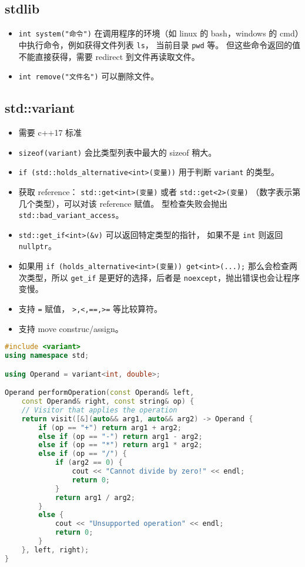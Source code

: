 \subsection{stdlib}
\begin{itemize}
\item \verb`int system("命令")` 在调用程序的环境（如 linux 的 bash，windows 的 cmd）中执行命令，例如获得文件列表 \verb`ls`， 当前目录 \verb`pwd` 等。 但这些命令返回的值不能直接获得，需要 redirect 到文件再读取文件。
\item \verb`int remove("文件名")` 可以删除文件。
\end{itemize}

\subsection{std::variant}
\begin{itemize}
\item 需要 c++17 标准
\item \verb`sizeof(variant)` 会比类型列表中最大的 sizeof 稍大。
\item \verb`if (std::holds_alternative<int>(变量))` 用于判断 \verb`variant` 的类型。
\item 获取 reference： \verb`std::get<int>(变量)` 或者 \verb`std::get<2>(变量)` （数字表示第几个类型），可以对该 reference 赋值。 型检查失败会抛出 \verb`std::bad_variant_access`。
\item \verb`std::get_if<int>(&v)` 可以返回特定类型的指针， 如果不是 \verb`int` 则返回 \verb`nullptr`。
\item 如果用 \verb`if (holds_alternative<int>(变量)) get<int>(...);` 那么会检查两次类型，所以 \verb`get_if` 是更好的选择，后者是 \verb`noexcept`，抛出错误也会让程序变慢。
\item 支持 \verb`=` 赋值， \verb`>,<,==,>=` 等比较算符。
\item 支持 move construc/assign。
\end{itemize}
\begin{lstlisting}[language=cpp]
#include <variant>
using namespace std;

using Operand = variant<int, double>;

Operand performOperation(const Operand& left,
    const Operand& right, const string& op) {
    // Visitor that applies the operation
    return visit([&](auto&& arg1, auto&& arg2) -> Operand {
        if (op == "+") return arg1 + arg2;
        else if (op == "-") return arg1 - arg2;
        else if (op == "*") return arg1 * arg2;
        else if (op == "/") {
            if (arg2 == 0) {
                cout << "Cannot divide by zero!" << endl;
                return 0;
            }
            return arg1 / arg2;
        }
        else {
            cout << "Unsupported operation" << endl;
            return 0;
        }
    }, left, right);
}
\end{lstlisting}
